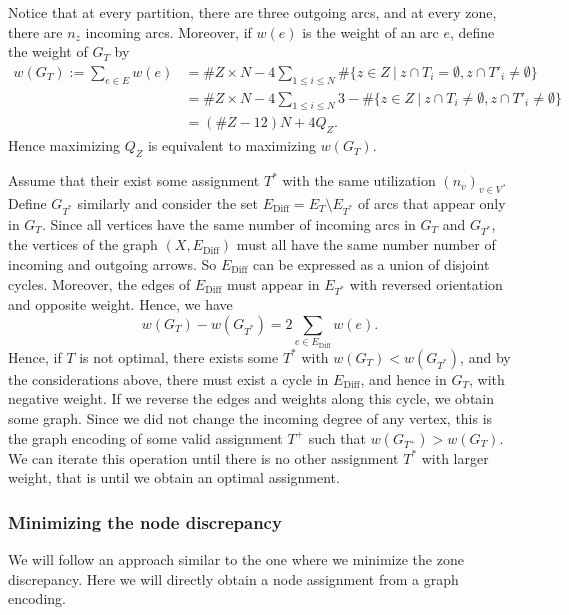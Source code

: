 \documentclass[]{article}
\begin{document}
Notice that at every partition, there are three outgoing arcs, and at every zone, there are $n_z$ incoming arcs. Moreover, if $w(e)$ is the weight of an arc $e$, define the weight of $G_T$ by
\begin{align*}
w(G_T) := \sum_{e\in E} w(e) &= \#Z \times N - 4 \sum_{1\le i\le N} \#\{z\in Z ~|~ z\cap T_i = \emptyset, z\cap T'_i \neq \emptyset\}	\\
&=\#Z \times N - 4 \sum_{1\le i\le N} 3- \#\{z\in Z ~|~ z\cap T_i \neq \emptyset, z\cap T'_i \neq \emptyset\} \\
&= (\#Z-12)N + 4 Q_Z.
\end{align*}
Hence maximizing $Q_Z$ is equivalent to maximizing $w(G_T)$.

Assume that their exist some assignment $T^*$ with the same utilization $(n_v)_{v\in V}$. Define $G_{T^*}$ similarly and consider the set $E_\mathrm{Diff} = E_T \setminus E_{T^*}$ of arcs that appear only in $G_T$. Since all vertices have the same number of incoming arcs in $G_T$ and $G_{T^*}$, the vertices of the graph $(X, E_\mathrm{Diff})$ must all have the same number number of incoming and outgoing arrows. So $E_\mathrm{Diff}$ can be expressed as a union of disjoint cycles. Moreover, the edges of $E_\mathrm{Diff}$ must appear in $E_{T^*}$ with reversed orientation and opposite weight. Hence, we have
$$
 w(G_T) - w(G_{T^*}) = 2 \sum_{e\in E_\mathrm{Diff}} w(e). 
$$
Hence, if $T$ is not optimal, there exists some $T^*$ with $w(G_T) < w(G_{T^*})$, and by the considerations above, there must exist a cycle in $E_\mathrm{Diff}$, and hence in $G_T$, with negative weight. If we reverse the edges and weights along this cycle, we obtain some graph. Since we did not change the incoming degree of any vertex, this is the graph encoding of some valid assignment $T^+$ such that $w(G_{T^+}) > w(G_T)$. We can iterate this operation until there is no other assignment $T^*$ with larger weight, that is until we obtain an optimal assignment.



\subsubsection{Minimizing the node discrepancy}

We will follow an approach similar to the one where we minimize the zone discrepancy. Here we will directly obtain a node assignment from a graph encoding.
\end{document}

